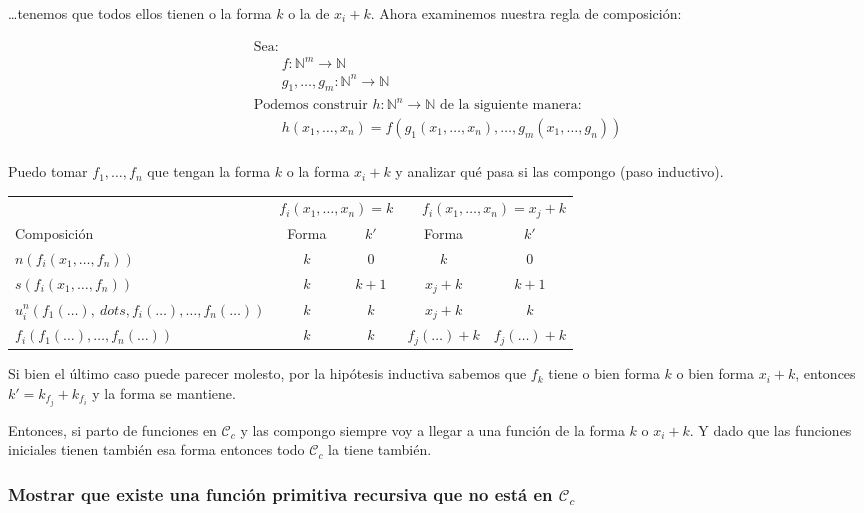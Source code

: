 \documentclass[fleqn, 11pt]{article}
\newcommand{\nat}{\mathbb{N}}
\newcommand{\Ccur}{\mathcal{C}}
\begin{document}
\dots tenemos que todos ellos tienen o la forma $k$ o la de $x_i + k$. Ahora
examinemos nuestra regla de composición:

\begin{gather*}
	\text{Sea:} \\
	\hspace{2em} f: \nat^m \to \nat \\
	\hspace{2em} g_1, \dots, g_m: \nat^n \to \nat \\
	\text{Podemos construir $h: \nat^n \to \nat$ de la siguiente manera:} \\
	\hspace{2em} h(x_1, \dots, x_n) =
	f(g_1(x_1, \dots, x_n), \dots, g_m(x_1, \dots, g_n)) \\
\end{gather*}

Puedo tomar $f_1, \dots, f_n$ que tengan la forma $k$ o la forma $x_i + k$  y
analizar qué pasa si las compongo (paso inductivo).

\begin{center}
	\begin{tabular}{lcccc}
		& \multicolumn{2}{l}{$f_i(x_1, \dots, x_n) = k$}
		& \multicolumn{2}{r}{$f_i(x_1, \dots, x_n) = x_j + k$} \\
		\cmidrule{2-5}
		Composición
		& Forma & $k'$    & Forma     & $k'$ \\ \toprule
		$n(f_i(x_1, \dots, f_n))$
		& $k$   & $0$     & $k$       & $0$ \\
		$s(f_i(x_1, \dots, f_n))$
		& $k$   & $k + 1$ & $x_j + k$ & $k + 1$ \\
		$u^n_i(f_1(\dots), \ dots, f_i(\dots), \dots, f_n(\dots))$
		& $k$   & $k$     & $x_j + k$ & $k$ \\
		$f_i(f_1(\dots), \dots, f_n(\dots))$
		& $k$   & $k$     & $f_j(\dots) + k$ & $f_j(\dots) + k$
	\end{tabular}
\end{center}

Si bien el último caso puede parecer molesto, por la hipótesis inductiva
sabemos que $f_k$ tiene o bien forma $k$ o bien forma $x_i + k$, entonces
$k' = k_{f_j} + k_{f_i}$ y la forma se mantiene.

Entonces, si parto de funciones en $\Ccur_c$ y las compongo siempre voy a
llegar a una función de la forma $k$ o $x_i + k$. Y dado que las funciones
iniciales tienen también esa forma entonces todo $\Ccur_c$ la tiene también.

\subsubsection{Mostrar que existe una función primitiva recursiva que no está
en $\Ccur_c$}
\end{document}

